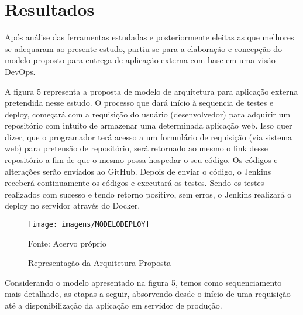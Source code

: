 \chapter{Resultados}\label{cap:resultados}

Após análise das ferramentas estudadas e posteriormente eleitas as que melhores se adequaram ao presente estudo, partiu-se para a elaboração e concepção do modelo proposto para entrega de aplicação externa com base em uma visão DevOps.

A figura 5 representa a proposta de modelo de arquitetura para aplicação externa pretendida nesse estudo. O processo que dará início à sequencia de testes e deploy, começará com a requisição do usuário (desenvolvedor) para adquirir um repositório com intuito de armazenar uma determinada aplicação web. Isso quer dizer, que o programador terá acesso a um formulário de requisição (via sistema web) para pretensão de repositório, será retornado ao mesmo o link desse repositório a fim de que o mesmo possa hospedar o seu código. Os códigos e alterações serão enviados ao GitHub. Depois de enviar o código, o Jenkins receberá continuamente os códigos e executará os testes. Sendo os testes realizados com sucesso e tendo retorno positivo, sem erros, o Jenkins realizará o deploy no servidor através do Docker.

\begin{figure} [htb]
	\centering
	\texttt{[image: imagens/MODELODEPLOY]}
\caption{Representação da Arquitetura Proposta}
Fonte: Acervo próprio
	\label{fig:modelodeploy}
\end{figure}


Considerando o modelo apresentado na figura 5, temos como sequenciamento mais detalhado, as etapas a seguir, absorvendo desde o início de uma requisição até a disponibilização da aplicação em servidor de produção.

